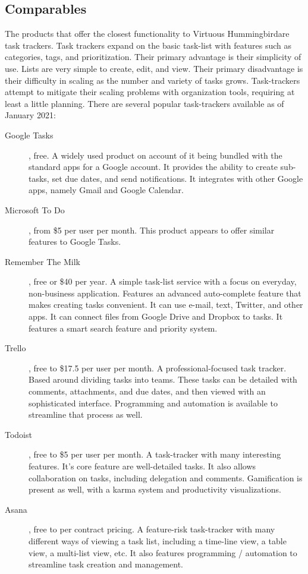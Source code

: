 \documentclass{article}
\newcommand{\name}{Virtuous Hummingbird}
\begin{document}

\subsection{Comparables}

The products that offer the closest functionality to \name are task trackers.
Task trackers expand on the basic task-list with features such as categories, tags, and prioritization.
Their primary advantage is their simplicity of use.
Lists are very simple to create, edit, and view.
Their primary disadvantage is their difficulty in scaling as the number and variety of tasks grows.
Task-trackers attempt to mitigate their scaling problems with organization tools, requiring at least a little planning.
There are several popular task-trackers available as of January 2021:

\begin{description}
    \item[Google Tasks], free.
    A widely used product on account of it being bundled with the standard apps for a Google account.
    It provides the ability to create sub-tasks, set due dates, and send notifications.
    It integrates with other Google apps, namely Gmail and Google Calendar.
    \item[Microsoft To Do], from \$5 per user per month.
    This product appears to offer similar features to Google Tasks.
    \item[Remember The Milk], free or \$40 per year.
    A simple task-list service with a focus on everyday, non-business application.
    Features an advanced auto-complete feature that makes creating tasks convenient.
    It can use e-mail, text, Twitter, and other apps.
    It can connect files from Google Drive and Dropbox to tasks.
    It features a smart search feature and priority system.
    \item[Trello], free to \$17.5 per user per month.
    A professional-focused task tracker.
    Based around dividing tasks into teams.
    These tasks can be detailed with comments, attachments, and due dates, and then viewed with an sophisticated interface.
    Programming and automation is available to streamline that process as well.
    \item[Todoist], free to \$5 per user per month.
    A task-tracker with many interesting features.
    It's core feature are well-detailed tasks.
    It also allows collaboration on tasks, including delegation and comments.
    Gamification is present as well, with a karma system and productivity visualizations.
    \item[Asana], free to per contract pricing.
    A feature-risk task-tracker with many different ways of viewing a task list, including a time-line view, a table view, a multi-list view, etc.
    It also features programming / automation to streamline task creation and management.
\end{description}
\end{document}
